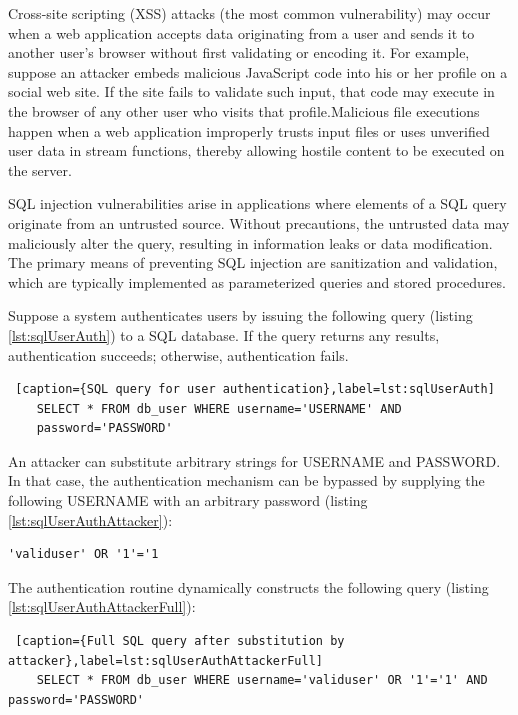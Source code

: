 Cross-site scripting (XSS) attacks (the most common vulnerability)
may occur when a web application accepts data originating
from a user and sends it to another user's browser without
first validating or encoding it. For example, suppose an attacker
embeds malicious JavaScript code into his or her profile on a
social web site. If the site fails to validate such input, that code
may execute in the browser of any other user who visits that
profile.Malicious file executions happen when a web application improperly trusts input files or uses unverified user data in stream functions, thereby allowing hostile content to be executed on the server.

SQL injection vulnerabilities arise in applications where elements of a SQL query originate from an untrusted source. Without precautions, the untrusted data may maliciously alter the query, resulting in information leaks or data modification. The primary means of preventing SQL injection are sanitization and validation, which are typically implemented as parameterized queries and stored procedures.

Suppose a system authenticates users by issuing the following query (listing \ref{lst:sqlUserAuth}) to a SQL database. If the query returns any results, authentication succeeds; otherwise, authentication fails.

\begin{lstlisting} [caption={SQL query for user authentication},label=lst:sqlUserAuth]
	SELECT * FROM db_user WHERE username='USERNAME' AND
	password='PASSWORD'
\end{lstlisting}

An attacker can substitute arbitrary strings for USERNAME and PASSWORD. In that case, the authentication mechanism can be bypassed by supplying the following USERNAME with an arbitrary password (listing \ref{lst:sqlUserAuthAttacker}):

\begin{lstlisting}[caption={SQL query after substitution by attacker},label=lst:sqlUserAuthAttacker]
	'validuser' OR '1'='1
\end{lstlisting}

The authentication routine dynamically constructs the following query (listing \ref{lst:sqlUserAuthAttackerFull}):

\begin{lstlisting} [caption={Full SQL query after substitution by attacker},label=lst:sqlUserAuthAttackerFull]
	SELECT * FROM db_user WHERE username='validuser' OR '1'='1' AND password='PASSWORD'
\end{lstlisting}


